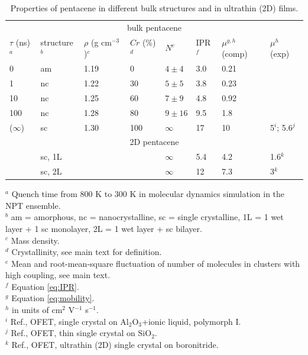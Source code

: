 \begin{table}
 \caption{\label{tab:fragments}Properties of pentacene in different bulk structures and in ultrathin (2D) films.}
\begin{center}
  \begin{tabular}[htbp]{@{}llllllll@{}}
    \hline
     \multicolumn{8}{c}{bulk pentacene} \\
    $\tau$ (ns)$^a$ & structure$^b$ & $\rho$ (g cm$^{-3}$)$^c$ &  $Cr$ (\%)$^d$  &  $N^e$   & IPR$^f$  & $\mu^{g,h}$ (comp) & $\mu^h$ (exp) \\
    \hline
    0       & am & 1.19   & 0     & $4\pm4$      & 3.0 & 0.21 &       \\
    1       & nc & 1.22   & 30   & $5\pm5$      & 3.8	 & 0.23 &       \\
    10     & nc & 1.25   & 60   & $7\pm9$    & 4.8 & 0.92   &        \\
    100   & nc & 1.28  & 80   & $9\pm16$  & 9.5 & 1.8   &        \\
 ($\infty$) & sc &  1.30  & 100 & $\infty$           & 17 & 10 & 5$^i$; 5.6$^j$ \\
    \hline
    \multicolumn{8}{c}{2D pentacene} \\
             & sc, 1L &        &      &  $\infty$ &       5.4   &  4.2 & 1.6$^k$\\
             & sc, 2L &        &     &  $\infty$ &         12 & 7.3 & 3$^k$ \\
    \hline
  \end{tabular}
\end{center}
\end{table}
$^a$ Quench time from 800 K to 300 K in molecular dynamics simulation in the NPT ensemble. \\
$^b$ am = amorphous, nc = nanocrystalline, sc = single crystalline, 1L = 1 wet layer + 1 sc monolayer, 2L = 1 wet layer + sc bilayer. \\
$^c$ Mass density. \\
$^d$ Crystallinity, see main text for definition. \\
$^e$ Mean and root-mean-square fluctuation of number of molecules in clusters with high coupling, see main text. \\
$^f$ Equation \eqref{eq:IPR}.  \\
$^g$ Equation \eqref{eq:mobility}. \\
$^h$ in units of cm$^2$ V$^{-1}$ s$^{-1}$. \\
$^i$ Ref.\cite{Takeyama2012_PentCryst}, OFET, single crystal on Al$_2$O$_3$+ionic liquid, polymorph I. \\
$^j$ Ref.\cite{Arabi2016}, OFET, thin single crystal on SiO$_2$. \\
$^k$ Ref.\cite{Zhang2016TF}, OFET, ultrathin (2D) single crystal on boronitride.

